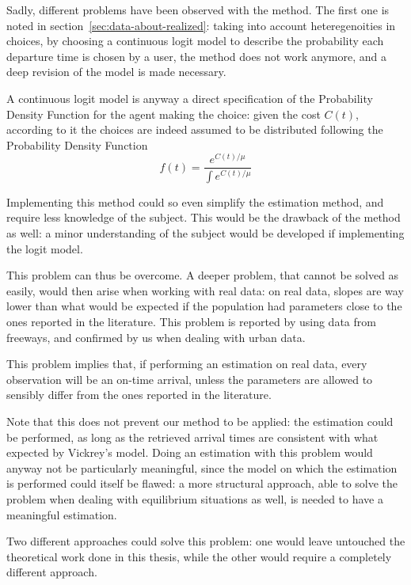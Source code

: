 Sadly, different problems have been observed with the method.
The first one is noted in section~\ref{sec:data-about-realized}:
taking into account heteregenoities in choices,
by choosing a continuous logit model to describe the probability each departure time is chosen by a user,
the method does not work anymore,
and a deep revision of the model is made necessary.

A continuous logit model is anyway a direct specification of the Probability Density Function for the agent making the choice:
given the cost \(C(t)\),
according to it the choices are indeed assumed to be distributed following the Probability Density Function
\begin{equation*}
  f(t) = \frac{e^{C(t)/\mu}}{\int e^{C(t)/\mu}}
\end{equation*}

Implementing this method could so even simplify the estimation method,
and require less knowledge of the subject.
This would be the drawback of the method as well:
a minor understanding of the subject would be developed if implementing the logit model.

This problem can thus be overcome.
A deeper problem, that cannot be solved as easily,
would then arise when working with real data:
on real data, slopes are way lower than what would be expected if the population had parameters close to the ones reported in the literature.
This problem is reported by \textcite{https://doi.org/10.1111/iere.12692} using data from freeways,
and confirmed by us when dealing with urban data.

This problem implies that, if performing an estimation on real data,
every observation will be an on-time arrival,
unless the parameters are allowed to sensibly differ from the ones reported in the literature.

Note that this does not prevent our method to be applied:
the estimation could be performed,
as long as the retrieved arrival times are consistent with what expected by Vickrey's model.
Doing an estimation with this problem would anyway not be particularly meaningful,
since the model on which the estimation is performed could itself be flawed:
a more structural approach, able to solve the problem when dealing with equilibrium situations as well, is needed to have a meaningful estimation.

Two different approaches could solve this problem:
one would leave untouched the theoretical work done in this thesis,
while the other would require a completely different approach.

